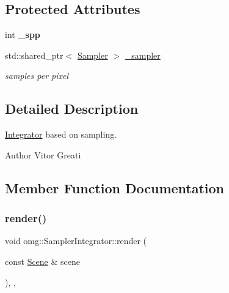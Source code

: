 \subsection*{Protected Attributes}
\begin{DoxyCompactItemize}
\item 
\mbox{\label{classomg_1_1_sampler_integrator_af005c6bd4439a052b6cd61532e5f52aa}} 
int {\bfseries \+\_\+spp}
\item 
\mbox{\label{classomg_1_1_sampler_integrator_a691d281396ff8f004817cc22f5638e94}} 
std\+::shared\+\_\+ptr$<$ \mbox{\hyperlink{classomg_1_1_sampler}{Sampler}} $>$ \mbox{\hyperlink{classomg_1_1_sampler_integrator_a691d281396ff8f004817cc22f5638e94}{\+\_\+sampler}}
\begin{DoxyCompactList}\small\item\em samples per pixel \end{DoxyCompactList}\end{DoxyCompactItemize}


\subsection{Detailed Description}
\mbox{\hyperlink{classomg_1_1_integrator}{Integrator}} based on sampling. 

\begin{DoxyAuthor}{Author}
Vitor Greati 
\end{DoxyAuthor}


\subsection{Member Function Documentation}
\mbox{\label{classomg_1_1_sampler_integrator_a4b147659d3227e8dd8a38e7518ab5d72}} 
\subsubsection{\texorpdfstring{render()}{render()}}
{\footnotesize\ttfamily void omg\+::\+Sampler\+Integrator\+::render (\begin{DoxyParamCaption}\item[{const \mbox{\hyperlink{classomg_1_1_scene}{Scene}} \&}]{scene }\end{DoxyParamCaption})\hspace{0.3cm}{\ttfamily [inline]}, {\ttfamily [override]}, {\ttfamily [virtual]}}



